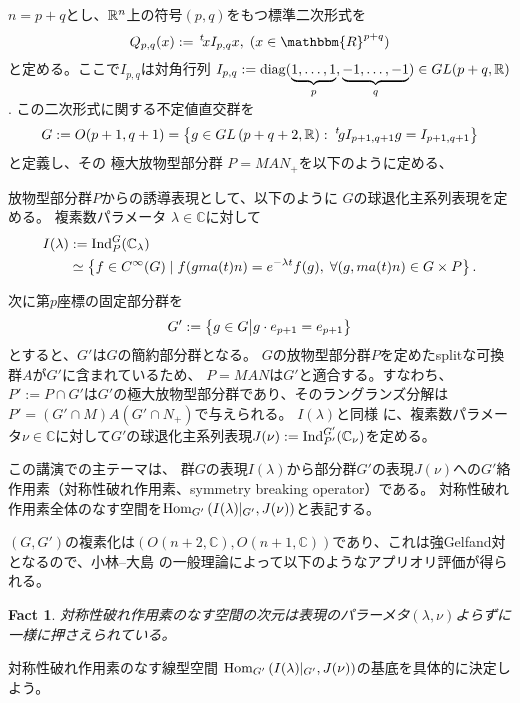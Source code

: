 \documentclass[12pt]{article} %
\newcommand{\assign}{:=}
\newcommand{\tmop}[1]{\ensuremath{\operatorname{#1}}}
\newcommand{\Hom}{\mbox{\normalfont Hom}}
\newcommand{\Ind}{\mbox{\normalfont Ind}}
\newtheorem{fact}[theorem]{Fact}
\theoremstyle{definition}
\theoremstyle{exampstyle} \newtheorem{examp}[theorem]{Theorem}
\renewcommand{\Q}{Q_{p,q}}
\newcommand{\IlambdaGprime}{I(\lambda)\kern-0.3em\mid_{G'}}
\newcommand{\SBO}{\Hom_{G'}\left(\IlambdaGprime,J(\nu) \right)}
\begin{document}
  \begin{versiona}
	  $n=p+q$と{し}、$\mathbb{R}^n$上の符号$(p,q)$をもつ標準二次形式を
	  \begin{equation*}
  \Q (x) \assign \,^t \! x I_{p, q} x, \; (x \in
  \mathbbm{R}^{p + q})
	  \end{equation*}
	  と定める。ここで$I_{p,q}$は対角行列
   $I_{p, q} \assign \tmop{diag} (\underbrace{1, \ldots, 1}_p, \underbrace{-
  1, \ldots, - 1}_q)\in GL(p+q,\R)$.
この二次形式に{関する}不定値直交群を
\begin{equation*}
	G \assign O (p +
1, q + 1)=\left\{ g\in GL\left( p+q+2,\R \right):\;^t\!gI_{p+1,q+1}g=I_{p+1,q+1} \right\}
\end{equation*}
と定義し、その
極大放物型部分群
$P=MAN_{+}$を以下のように定める、

放物型部分群$P$からの誘導表現として、以下のように
$G$の球退化主系列表現を定める。
複素数パラメータ
\renewcommand{\C}{\mathbb{C}}
$\lambda\in\C$に対して
\begin{align*}
I(\lambda)&:=\Ind_P^G(\C_\lambda)\\
&\simeq \left\{ f\in C^{\infty}(G)\mid f(gma(t)n)=e^{-\lambda t}f(g),\;\forall(g,ma(t)n)\in G\times P \right\}.
\end{align*}

次に第$p$座標の固定部分群を
\begin{equation*}
	G':=\left\{g \in G\big| g \cdot e_{p + 1} = e_{p + 1}\right\}
\end{equation*}
とすると、$G'$は$G$の簡約部分群となる。
$G$の放物型部分群$P$を定めたsplitな可換群$A$が$G'$に含まれているため、
$P=MAN$は$G'$と適合する。すなわち、$P':=P\cap G'$は$G'$の極大放物型部分群であり、そのラングランズ分解は
$P'=(G'\cap M)A(G'\cap N_+)$で与えられ{る}。
$I(\lambda)$と同様
に、複素数パラメータ$\nu\in\C$に対して$G'$の球退化主系列表現$J(\nu):=\Ind_{P'}^{G'}(\C_{\nu})$を定める。

この講演での主テーマは{、}
群$G$の表現$I(\lambda)$から部分群$G'$の表現$J(\nu)$への$G'$絡作用素（対称性破れ作用素、symmetry breaking operator）である。
対称性破れ作用素全体のなす空間を$\SBO$と表記す{る}。

$(G,G')$の複素化は$(O(n+2,\C),O(n+1,\C))$であり、これは強Gelfand対となるので、小林--大島
\cite{kobayashi2013finite}の一般理論によって以下のようなアプリオリ評価が得られる。
\begin{fact}
	対称性破れ作用素のなす空間の次元は表現のパラーメタ$(\lambda,\nu)$よらずに一様に押さえられている。
\end{fact}
対称性破れ作用素のなす線型空間
$\SBO$の基底を具体的に決定しよう。


\end{versiona}
\end{document}
